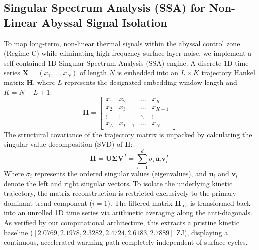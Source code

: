 \documentclass[11pt,a4paper]{article}
\begin{document}
\subsection{Singular Spectrum Analysis (SSA) for Non-Linear Abyssal Signal Isolation}
To map long-term, non-linear thermal signals within the abyssal control zone (Regime C) while eliminating high-frequency surface-layer noise, we implement a self-contained 1D Singular Spectrum Analysis (SSA) engine. A discrete 1D time series $\mathbf{X} = (x_1, \dots, x_N)$ of length $N$ is embedded into an $L \times K$ trajectory Hankel matrix $\mathbf{H}$, where $L$ represents the designated embedding window length and $K = N - L + 1$:
\begin{equation}
    \mathbf{H} = \begin{bmatrix}
    x_1 & x_2 & \dots & x_K \\
    x_2 & x_3 & \dots & x_{K+1} \\
    \vdots & \vdots & \ddots & \vdots \\
    x_L & x_{L+1} & \dots & x_N
    \end{bmatrix}
\end{equation}
The structural covariance of the trajectory matrix is unpacked by calculating the singular value decomposition (SVD) of $\mathbf{H}$:
\begin{equation}
    \mathbf{H} = \mathbf{U} \mathbf{\Sigma} \mathbf{V}^T = \sum_{i=1}^{d} \sigma_i \mathbf{u}_i \mathbf{v}_i^T
\end{equation}
Where $\sigma_i$ represents the ordered singular values (eigenvalues), and $\mathbf{u}_i$ and $\mathbf{v}_i$ denote the left and right singular vectors. To isolate the underlying kinetic trajectory, the matrix reconstruction is restricted exclusively to the primary dominant trend component ($i=1$). The filtered matrix $\mathbf{H}_{\text{rec}}$ is transformed back into an unrolled 1D time series via arithmetic averaging along the anti-diagonals. As verified by our computational architecture, this extracts a pristine kinetic baseline ($[2.0769, 2.1978, 2.3282, 2.4724, 2.6183, 2.7889]$ ZJ), displaying a continuous, accelerated warming path completely independent of surface cycles.
\end{document}
